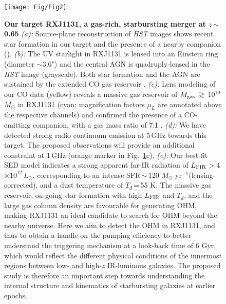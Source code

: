 \documentclass[letterpaper,11pt]{article}
\newcommand{\Lsun}{\mbox{$L_{\odot}$}\xspace}
\newcommand{\Msun}{\mbox{$M_{\odot}$}\xspace}
\newcommand{\LFIR}{\mbox{$L_{\rm FIR}$}\xspace}
\newcommand{\pmOne}{\mbox{$^{-1}$}\xspace}
\newcommand{\Fig}[1]{Fig.~\ref{fig:#1}}
\newcommand{\E}[1]{\mbox{$\times10^{#1}$}}
\newcommand{\eq}{\,=\,}
\newcommand{\ssim}{\,$\sim$\,}
\newcommand{\obs}{observations\xspace}
\begin{document}
\begin{figure}[ptbh]
\centering
\texttt{[image: Fig/Fig2]}
\vspace{-0.85em}
\caption{
{\bf Our target RXJ1131, a gas-rich, starbursting merger at $z$\ssim0.65}
{\em (a):} Source-plane reconstruction of {\it HST} images shows recent star formation in our target and
the presence of a nearby companion (\citealt{Claeskens06a}).
{\em (b):}
The UV starlight in RXJ1131 is lensed into an Einstein ring (diameter $\sim$3.6") and the central AGN is
quadruply-lensed in the {\it HST} image (grayscale). Both star formation and the AGN are sustained
by the extended CO gas reservoir \citep[contours; ][]{Leung17a}.
{\em (c):}
Lens modeling of our CO data (yellow) 
reveals a massive gas reservoir of $M_{\rm gas}$\,$\gtrsim$\,10$^{10}$\Msun in RXJ1131 
(cyan; magnification factors $\mu_{L}$ are annotated above the respective channels) and
confirmed the presence of a CO-emitting companion, with a gas mass ratio of 7:1 \citep[bottom panel;][]{Leung17a}.
{\em (d):}
We have detected strong radio continuum emission at 5\,GHz towards this target.
The proposed \obs will provide an additional constraint at 1\,GHz (orange marker in \Fig{hst}e).
{\em (e):} Our best-fit SED model indicates a strong apparent far-IR radiation of \LFIR$>$4\E{12}\,\Lsun, corresponding to
an intense SFR\ssim120 \Msun yr\pmOne (lensing-corrected), and a dust temperature of $T_{d}$\eq55 K.
The massive gas reservoir, on-going star formation with high \LFIR and $T_{d}$, and the large gas column density
are favourable for generating OHM, making RXJ1131 an
ideal candidate to search for OHM beyond the nearby universe.
Here we aim to detect the OHM in RXJ1131, and thus to obtain a handle on the pumping efficiency
to better understand the triggering mechanism at a look-back time of 6 Gyr, which
would reflect the different physical conditions of the innermost regions between low- and high-$z$ IR-luminous galaxies.
The proposed study is therefore an important step towards understanding 
the internal structure and kinematics of
starbursting galaxies at earlier epochs.
\label{fig:hst}}
\end{figure}
\end{document}
